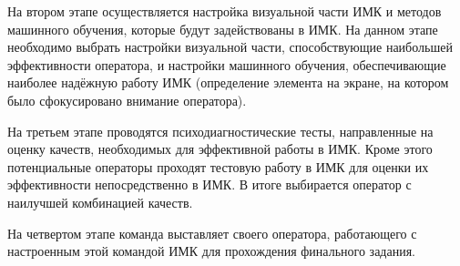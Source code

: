 На втором этапе осуществляется  настройка визуальной части ИМК и методов машинного обучения, которые будут задействованы в ИМК. На данном этапе необходимо выбрать настройки визуальной части, способствующие наибольшей эффективности оператора, и настройки машинного обучения, обеспечивающие наиболее надёжную работу ИМК (определение элемента на экране, на котором было сфокусировано внимание оператора).

На третьем этапе проводятся психодиагностические тесты, направленные на оценку качеств, необходимых для эффективной работы в ИМК. Кроме этого потенциальные операторы проходят тестовую работу в ИМК для оценки их эффективности непосредственно в ИМК. В итоге выбирается оператор с наилучшей комбинацией качеств.

На четвертом этапе команда выставляет своего оператора, работающего с настроенным этой командой ИМК для прохождения финального задания.